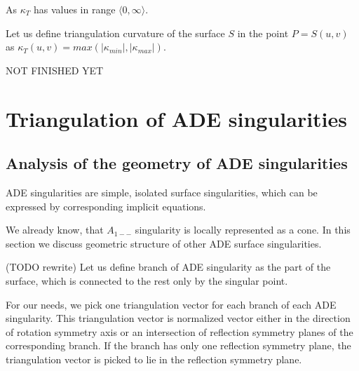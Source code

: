 As $\kappa_T$ has values in range $\langle 0, \infty \rangle$.

\begin{definition}
    Let us define triangulation curvature of the surface $S$ in the point $P=S(u, v)$ as
    $\kappa_T(u, v) = max(|\kappa_{min}|, |\kappa_{max}|).$
\end{definition}

NOT FINISHED YET

\section{Triangulation of ADE singularities}
\label{sub3.2}

\subsection*{Analysis of the geometry of ADE singularities}

ADE singularities are simple, isolated surface singularities, which can be
expressed by corresponding implicit equations.

We already know, that $A_{1--}$ singularity is locally represented as a cone.
In this section we discuss geometric structure of other ADE surface singularities.

\begin{definition} (TODO rewrite)
    Let us define branch of ADE singularity as the part of the surface,
    which is connected to the rest only by the singular point.
\end{definition}

For our needs, we pick one triangulation vector for each branch of
each ADE singularity. This triangulation vector is normalized vector
either in the direction
of rotation symmetry axis or an intersection of reflection symmetry planes
of the corresponding branch. If the branch has only one reflection symmetry
plane, the triangulation vector is picked to lie in the reflection
symmetry plane.

